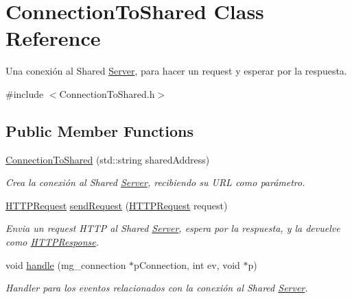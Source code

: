 \hypertarget{class_connection_to_shared}{}\section{Connection\+To\+Shared Class Reference}
\label{class_connection_to_shared}


Una conexión al Shared \hyperlink{class_server}{Server}, para hacer un request y esperar por la respuesta.  




{\ttfamily \#include $<$Connection\+To\+Shared.\+h$>$}

\subsection*{Public Member Functions}
\begin{DoxyCompactItemize}
\item 
\hyperlink{class_connection_to_shared_a4dfe5a7bd4837a5d3f016c253f7c506a}{Connection\+To\+Shared} (std\+::string shared\+Address)
\begin{DoxyCompactList}\small\item\em Crea la conexión al Shared \hyperlink{class_server}{Server}, recibiendo su U\+R\+L como parámetro. \end{DoxyCompactList}\item 
\hyperlink{class_h_t_t_p_request}{H\+T\+T\+P\+Request} \hyperlink{class_connection_to_shared_aaab61972c747214b9693c730093dc6ba}{send\+Request} (\hyperlink{class_h_t_t_p_request}{H\+T\+T\+P\+Request} request)
\begin{DoxyCompactList}\small\item\em Envia un request H\+T\+T\+P al Shared \hyperlink{class_server}{Server}, espera por la respuesta, y la devuelve como \hyperlink{class_h_t_t_p_response}{H\+T\+T\+P\+Response}. \end{DoxyCompactList}\item 
void \hyperlink{class_connection_to_shared_a24e08608ac219d2bac62e47b90bbc1d7}{handle} (mg\+\_\+connection $\ast$p\+Connection, int ev, void $\ast$p)
\begin{DoxyCompactList}\small\item\em Handler para los eventos relacionados con la conexión al Shared \hyperlink{class_server}{Server}. \end{DoxyCompactList}\end{DoxyCompactItemize}
